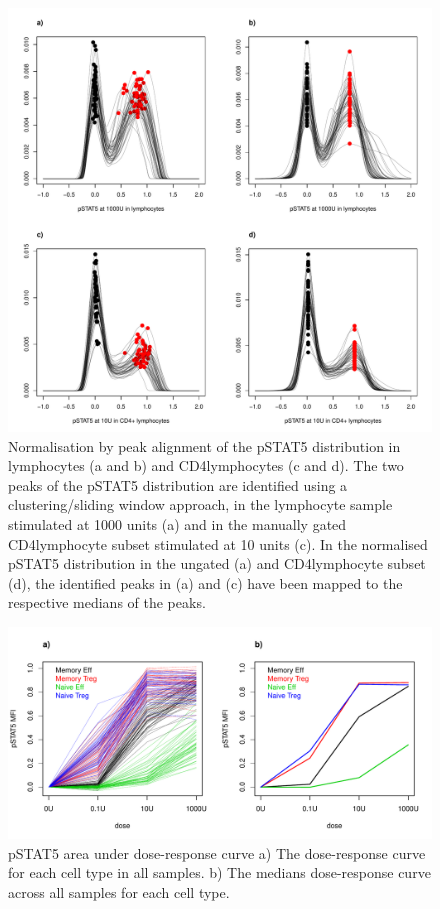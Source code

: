 \begin{figure}[h]
    \centering
    \includegraphics[scale=.5]{IL2/figures/pstat5-peak-normalisation.pdf}
    {Normalisation by peak alignment of the pSTAT5 distribution in lymphocytes (a and b) and CD4\positive lymphocytes (c and d).}
    {
      The two peaks of the pSTAT5 distribution are identified using a clustering/sliding window approach,
      in the lymphocyte sample stimulated at 1000 units (a) and in the manually gated CD4\positive lymphocyte subset stimulated at 10 units (c).
      In the normalised pSTAT5 distribution in the ungated (a) and CD4\positive lymphocyte subset (d),
      the identified peaks in (a) and (c) have been mapped to the respective medians of the peaks.
    }
\end{figure}


\begin{figure}[h]
    \centering
    \includegraphics[scale=.5]{IL2/figures/pstat5-auc-celltypes.pdf}
    { pSTAT5 area under dose-response curve }
    { a) The dose-response curve for each cell type in all samples. b) The medians dose-response curve across all samples for each cell type.}
\end{figure}

